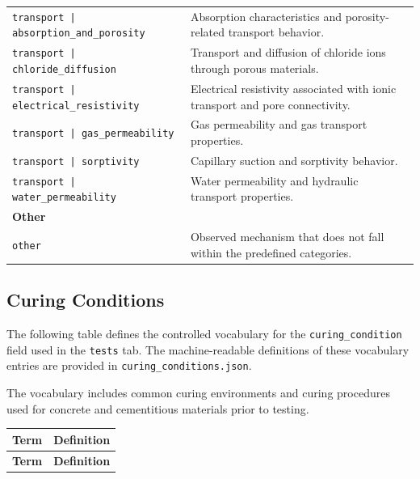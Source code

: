 \documentclass[11pt]{book}
\begin{document}
{\begin{longtable}{p{}p{}}
\texttt{transport | absorption\_and\_porosity} &
Absorption characteristics and porosity-related transport behavior. \\

\texttt{transport | chloride\_diffusion} &
Transport and diffusion of chloride ions through porous materials. \\

\texttt{transport | electrical\_resistivity} &
Electrical resistivity associated with ionic transport and pore connectivity. \\

\texttt{transport | gas\_permeability} &
Gas permeability and gas transport properties. \\

\texttt{transport | sorptivity} &
Capillary suction and sorptivity behavior. \\

\texttt{transport | water\_permeability} &
Water permeability and hydraulic transport properties. \\

\hline
\multicolumn{2}{l}{\textbf{Other}}\\
\hline

\texttt{other} &
Observed mechanism that does not fall within the predefined categories. \\

\hline
\end{longtable}

\subsection{Curing Conditions}
\label{vocab:curing_conditions_list}

The following table defines the controlled vocabulary for the \texttt{curing\_condition} field used in the \texttt{tests} tab. The machine-readable definitions of these vocabulary entries are provided in \texttt{curing\_conditions.json}.

The vocabulary includes common curing environments and curing procedures used for concrete and cementitious materials prior to testing.

\begin{longtable}{p{}p{}}
\hline
\textbf{Term} & \textbf{Definition} \\
\hline
\endfirsthead

\hline
\textbf{Term} & \textbf{Definition} \\
\hline
\endhead


\end{longtable}}
\end{document}
